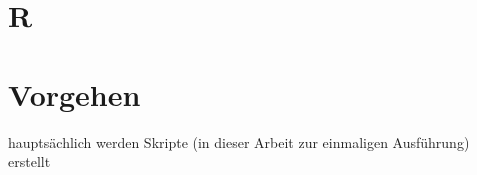 %


\section{R}

\parencite{adler_r_2012}

\section{Vorgehen}

hauptsächlich werden Skripte (in dieser Arbeit zur einmaligen Ausführung) erstellt